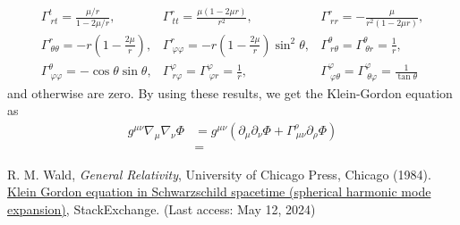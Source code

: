 \documentclass[a4paper,pdftex,10pt]{article}
\begin{document}
\begin{enumerate}
\begin{equation}
\begin{array}{lll}
            \Gamma^{t}_{\ rt}
            =
            \frac{\mu/r}{1-2\mu/r}
            ,
             &
            \Gamma^{r}_{\ tt}
            =
            \frac{\mu(1-2\mu r)}{r^2}
            ,
             &
            \Gamma^{r}_{\ rr}
            =
            -\frac{\mu}{r^2(1-2\mu r)}
            ,
            \\
            \Gamma^{r}_{\ \theta\theta}
            =
            -r\left( 1-\frac{2\mu}{r} \right)
            ,
             &
            \Gamma^{r}_{\ \varphi\varphi}
            =
            -r\left( 1-\frac{2\mu}{r} \right)\sin^2\theta
            ,
             &
            \Gamma^{\theta}_{\ r\theta}
            =
            \Gamma^{\theta}_{\ \theta r}
            =
            \frac{1}{r}
            ,
            \\
            \Gamma^{\theta}_{\ \varphi\varphi}
            =
            -\cos\theta\sin\theta
            ,
             &
            \Gamma^{\varphi}_{\ r\varphi}
            =
            \Gamma^{\varphi}_{\ \varphi r}
            =
            \frac{1}{r}
            ,
             &
            \Gamma^{\varphi}_{\ \varphi\theta}
            =
            \Gamma^{\varphi}_{\ \theta\varphi}
            =
            \frac{1}{\tan\theta}
          \end{array}
        \end{equation}
        and otherwise are zero. By using these results, we get the Klein-Gordon equation as
        \begin{align}
          g^{\mu\nu}\nabla_{\mu}\nabla_{\nu}
          \Phi
          &=
          g^{\mu\nu}
          (\partial_{\mu}\partial_{\nu}\Phi+\Gamma^{\rho}_{\ \mu\nu}\partial_{\rho}\Phi)
          \nonumber
          \\
          &=
        \end{align}












\end{enumerate}

\clearpage
\begin{thebibliography}{99}
  R. M. Wald, \textit{General Relativity}, University of Chicago Press, Chicago (1984).
  \href{https://physics.stackexchange.com/questions/313336/klein-gordon-equation-in-schwarzschild-spacetime-spherical-harmonic-mode-expans}{Klein Gordon equation in Schwarzschild spacetime (spherical harmonic mode expansion)}, StackExchange. (Last access: May 12, 2024)
\end{thebibliography}


% 
% 

\end{document}
